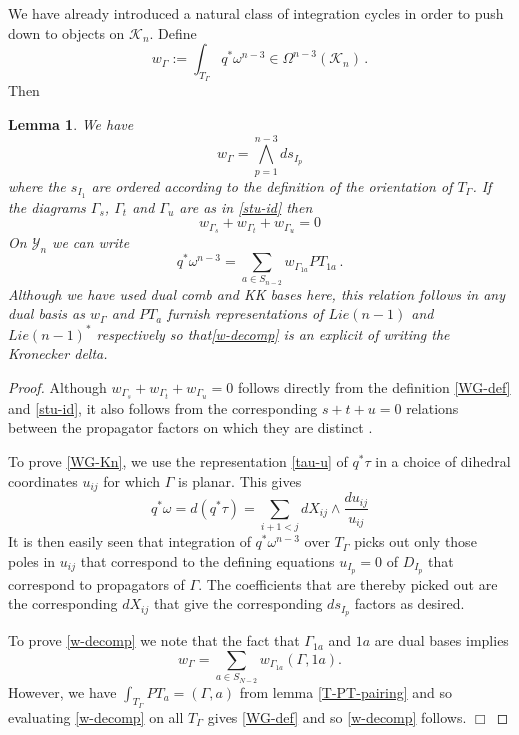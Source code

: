 \documentclass[11pt]{article}
\newcommand{\cK}{\mathcal{K}}
\newcommand{\cY}{\mathcal{Y}}
\newcommand{\1}{{\rm 1\hskip-0.25em I}}
\newtheorem{lemma}{Lemma}[section]
\begin{document}
We have already introduced a natural class of integration cycles in order to push down to objects on $\cK_n$.  
Define
\begin{equation}  
w_\Gamma:=\int_{T_\Gamma} q^* \omega^{n-3} \in \Omega^{n-3}(\cK_n)\, .\label{WG-def}
\end{equation}
Then
\begin{lemma}  We have
\begin{equation}
w_\Gamma=\bigwedge_{p=1}^{n-3} ds_{I_p} \label{WG-Kn}
\end{equation}
where the $s_{I_1}$ are ordered according to the definition of the orientation of $T_\Gamma$.  If the diagrams $\Gamma_s$, $\Gamma_t$ and $\Gamma_u$ are as in \eqref{stu-id} then \begin{equation}
 w_{\Gamma_s}+w_{\Gamma_t}+w_{\Gamma_u}=0 \label{WG-stu}
\end{equation}
On $\cY_n$ we can write
\begin{equation}
q^*\omega^{n-3}=\sum_{a\in S_{n-2}} w_{\Gamma_{1a}}  PT_{1a}\, .
\label{w-decomp}
\end{equation}
Although we have used dual comb and KK bases here, this relation follows in any dual basis as $w_\Gamma$ and $PT_a$ furnish representations of $Lie(n-1)$ and $Lie(n-1)^*$ respectively so that\eqref{w-decomp} is an explicit of writing the Kronecker delta.
\end{lemma}

\begin{proof}
Although $w_{\Gamma_s}+w_{\Gamma_t}+w_{\Gamma_u}=0$ follows directly from the  definition \eqref{WG-def} and \eqref{stu-id}, it also follows from the corresponding $s+t+u=0$ relations between the propagator factors on which they are distinct \cite{Arkani-Hamed:2017mur}.  

To prove \eqref{WG-Kn}, we use the representation \eqref{tau-u} of $q^*\tau$ in a choice of dihedral coordinates $u_{ij}$ for which $\Gamma$ is planar. This gives
\begin{equation}
q^*\omega=d(q^*\tau)=\sum_{i+1<j} d X_{ij}\wedge\frac{du_{ij}}{u_{ij}}
\end{equation}
 It is then easily seen that integration of $q^*\omega^{n-3}$  over $T_\Gamma$ picks out only those poles in $u_{ij}$ that correspond to the defining equations  $u_{I_p}=0$ of $D_{I_p}$  that correspond to propagators of $\Gamma$.  The coefficients that are thereby picked out are the corresponding $dX_{ij}$ that give the corresponding $ds_{I_p}$ factors as desired.

To prove \eqref{w-decomp} we note that the fact that $\Gamma_{1a}$ and $1a$ are dual bases implies 
\begin{equation}
w_\Gamma=\sum_{a\in S_{N-2}} w_{\Gamma_{1a}} (\Gamma,1a).  
\end{equation}
However, we have $\int_{T_\Gamma} PT_a=(\Gamma,a)$ from lemma \ref{T-PT-pairing} and so evaluating \eqref{w-decomp} on all $T_\Gamma$ gives \eqref{WG-def} and so \eqref{w-decomp} follows. $\Box$
\end{proof}
\end{document}
